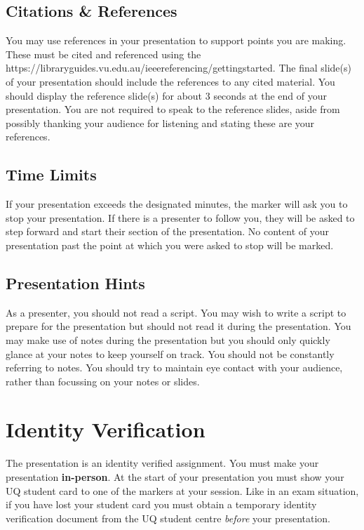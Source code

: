 \documentclass{csse4400}
\begin{document}
\subsection{Citations \& References}
You may use references in your presentation to support points you are making.
These must be cited and referenced using the 
{https://libraryguides.vu.edu.au/ieeereferencing/gettingstarted}.
The final slide(s) of your presentation should include the references to any cited material.
You should display the reference slide(s) for about 3 seconds at the end of your presentation.
You are not required to speak to the reference slides,
aside from possibly thanking your audience for listening and stating these are your references.

\subsection{Time Limits}

If your presentation exceeds the designated minutes, the marker will ask you to stop your presentation.
If there is a presenter to follow you, they will be asked to step forward and start their section of the presentation.
No content of your presentation past the point at which you were asked to stop will be marked.

\subsection{Presentation Hints}

As a presenter, you should not read a script.
You may wish to write a script to prepare for the presentation but should not read it during the presentation.
You may make use of notes during the presentation but you should only quickly glance at your notes to keep yourself on track.
You should not be constantly referring to notes.
You should try to maintain eye contact with your audience, rather than focussing on your notes or slides.

\section{Identity Verification}
The presentation is an identity verified assignment.
You must make your presentation \textbf{in-person}.
At the start of your presentation you must show your UQ student card to one of the markers at your session.
Like in an exam situation, if you have lost your student card
you must obtain a temporary identity verification document from the UQ student centre \emph{before} your presentation.
\end{document}
